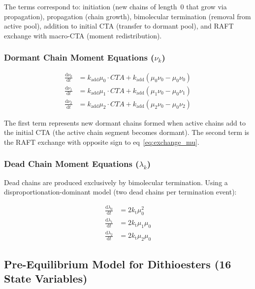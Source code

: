 \documentclass[journal=mamobx,manuscript=suppinfo]{achemso}
\begin{document}
\noindent The terms correspond to: initiation (new chains of length~0 that
grow via propagation), propagation (chain growth), bimolecular termination
(removal from active pool), addition to initial CTA (transfer to dormant pool),
and RAFT exchange with macro-CTA (moment redistribution).

\subsubsection{Dormant Chain Moment Equations ($\nu_k$)}

\begin{align}
  \frac{\mathrm{d}\nu_0}{\mathrm{d}t}
    &= k_{\mathrm{add}} \mu_0 \cdot \mathit{CTA}
       + k_{\mathrm{add}} (\mu_0 \nu_0 - \mu_0 \nu_0)
    \label{eq:dnu0} \\[6pt]
  \frac{\mathrm{d}\nu_1}{\mathrm{d}t}
    &= k_{\mathrm{add}} \mu_1 \cdot \mathit{CTA}
       + k_{\mathrm{add}} (\mu_1 \nu_0 - \mu_0 \nu_1)
    \label{eq:dnu1} \\[6pt]
  \frac{\mathrm{d}\nu_2}{\mathrm{d}t}
    &= k_{\mathrm{add}} \mu_2 \cdot \mathit{CTA}
       + k_{\mathrm{add}} (\mu_2 \nu_0 - \mu_0 \nu_2)
    \label{eq:dnu2}
\end{align}

\noindent The first term represents new dormant chains formed when active chains
add to the initial CTA (the active chain segment becomes dormant). The second
term is the RAFT exchange with opposite sign to eq~\ref{eq:exchange_mu}.

\subsubsection{Dead Chain Moment Equations ($\lambda_k$)}

Dead chains are produced exclusively by bimolecular termination. Using a
disproportionation-dominant model (two dead chains per termination event):

\begin{align}
  \frac{\mathrm{d}\lambda_0}{\mathrm{d}t}
    &= 2 k_{\mathrm{t}} \mu_0^2
    \label{eq:dlam0} \\[6pt]
  \frac{\mathrm{d}\lambda_1}{\mathrm{d}t}
    &= 2 k_{\mathrm{t}} \mu_1 \mu_0
    \label{eq:dlam1} \\[6pt]
  \frac{\mathrm{d}\lambda_2}{\mathrm{d}t}
    &= 2 k_{\mathrm{t}} \mu_2 \mu_0
    \label{eq:dlam2}
\end{align}

\subsection{Pre-Equilibrium Model for Dithioesters (16 State Variables)}
\label{sec:pre-eq}
\end{document}
